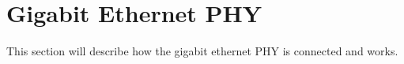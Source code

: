 \section{Gigabit Ethernet PHY} %
    This section will describe how the gigabit ethernet PHY is connected and works.
